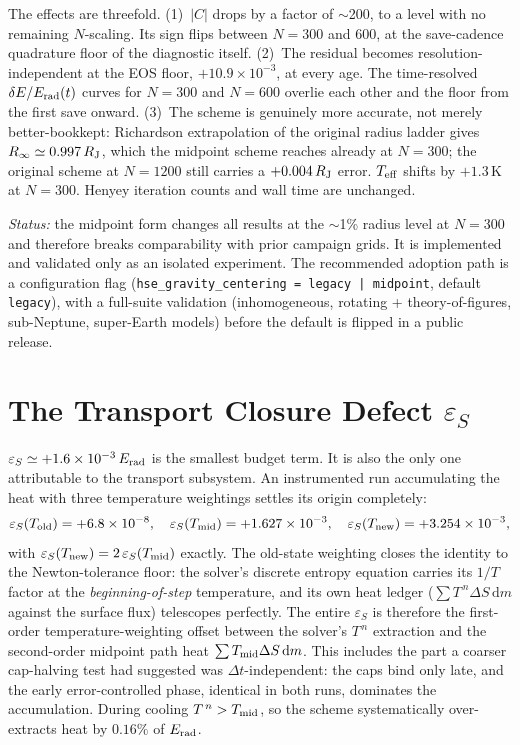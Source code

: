 \documentclass{aastex631}
\newcommand{\dd}{\mathrm{d}}
\newcommand{\Erad}{E_{\rm rad}}
\newcommand{\Teff}{T_{\rm eff}}
\newcommand{\epsS}{\varepsilon_S}
\newcommand{\dE}{\delta E}
\begin{document}
The effects are threefold.  (1)~$|C|$ drops by a factor of $\sim$200, to
a level with no remaining $N$-scaling.  Its sign flips between $N=300$ and
600, at the save-cadence quadrature floor of the diagnostic itself.
(2)~The residual becomes resolution-independent at the EOS floor,
$+10.9\times10^{-3}$, at every age.  The time-resolved
$\dE/\Erad(t)$ curves for $N=300$ and $N=600$ overlie each other and the
floor from the first save onward.  (3)~The scheme is genuinely more
accurate, not merely better-bookkept: Richardson extrapolation of the
original radius ladder gives $R_\infty \simeq 0.997\,R_{\rm J}$, which
the midpoint scheme reaches already at $N=300$; the original scheme at
$N=1200$ still carries a $+0.004\,R_{\rm J}$ error.  $\Teff$ shifts by
$+1.3$\,K at $N=300$.  Henyey iteration counts and wall time are
unchanged.

\emph{Status:} the midpoint form changes all results at the $\sim$1\%
radius level at $N=300$ and therefore breaks comparability with prior
campaign grids.  It is implemented and validated only as an isolated
experiment.  The recommended adoption path is a configuration flag
(\texttt{hse\_gravity\_centering = legacy | midpoint}, default
\texttt{legacy}), with a full-suite validation (inhomogeneous, rotating +
theory-of-figures, sub-Neptune, super-Earth models) before the default is
flipped in a public release.

\section{The Transport Closure Defect $\epsS$}
\label{sec:epsS}

$\epsS \simeq +1.6\times10^{-3}\,\Erad$ is the smallest budget term.  It
is also the only one attributable to the transport subsystem.  An
instrumented
run accumulating the heat with three temperature weightings settles its
origin completely:
\begin{equation}
\epsS(T_{\rm old}) = +6.8\times10^{-8}, \quad
\epsS(T_{\rm mid}) = +1.627\times10^{-3}, \quad
\epsS(T_{\rm new}) = +3.254\times10^{-3},
\end{equation}
with $\epsS(T_{\rm new}) = 2\,\epsS(T_{\rm mid})$ exactly.  The
old-state weighting closes the identity to the Newton-tolerance floor:
the solver's discrete entropy equation carries its $1/T$ factor at the
\emph{beginning-of-step} temperature, and its own heat ledger
($\sum T^{\,n}\Delta S\,\dd m$ against the surface flux) telescopes
perfectly.  The entire $\epsS$ is therefore the first-order
temperature-weighting offset between the solver's $T^{\,n}$ extraction
and the second-order midpoint path heat $\sum T_{\rm mid}\Delta S\,\dd
m$.  This includes the part a coarser cap-halving test had suggested was
$\Delta t$-independent: the caps bind only late, and the early
error-controlled phase, identical in both runs, dominates the
accumulation.  During cooling $T^{\,n} > T_{\rm mid}$, so the scheme
systematically over-extracts heat by $0.16\%$ of $\Erad$.
\end{document}
